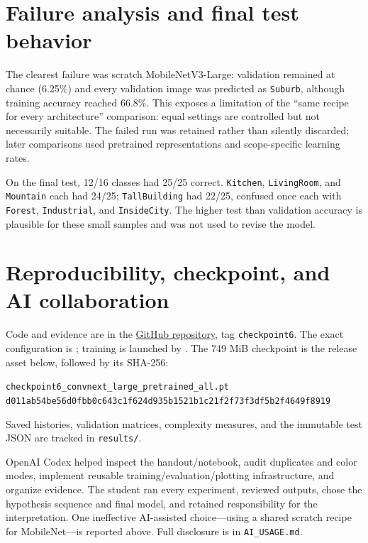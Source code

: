 \documentclass[10pt]{article}
\begin{document}
\section*{Failure analysis and final test behavior}
The clearest failure was scratch MobileNetV3-Large: validation remained at
chance (6.25\%) and every validation image was predicted as \texttt{Suburb},
although training accuracy reached 66.8\%. This exposes a limitation of the
``same recipe for every architecture'' comparison: equal settings are
controlled but not necessarily suitable. The failed run was retained rather
than silently discarded; later comparisons used pretrained representations
and scope-specific learning rates.

On the final test, 12/16 classes had 25/25 correct. \texttt{Kitchen},
\texttt{LivingRoom}, and \texttt{Mountain} each had 24/25; \texttt{TallBuilding}
had 22/25, confused once each with \texttt{Forest}, \texttt{Industrial}, and
\texttt{InsideCity}. The higher test than validation accuracy is plausible for
these small samples and was not used to revise the model.

\section*{Reproducibility, checkpoint, and AI collaboration}
Code and evidence are in the
\href{https://github.com/PritomKumarPaul/computer-vision-assignment1}{GitHub repository},
tag \texttt{checkpoint6}. The exact configuration is
; training is
launched by . The 749 MiB
checkpoint is the release asset below, followed by its SHA-256:
\begin{center}
{\scriptsize\texttt{checkpoint6\_convnext\_large\_pretrained\_all.pt}}\\[-1pt]
{\tiny\texttt{d011ab54be56d0fbb0c643c1f624d935b1521b1c21f2f73f3df5b2f4649f8919}}
\end{center}
Saved histories, validation matrices, complexity measures, and the immutable
test JSON are tracked in \texttt{results/}.

OpenAI Codex helped inspect the handout/notebook, audit duplicates and color
modes, implement reusable training/evaluation/plotting infrastructure, and
organize evidence. The student ran every experiment, reviewed outputs, chose
the hypothesis sequence and final model, and retained responsibility for the
interpretation. One ineffective AI-assisted choice---using a shared scratch
recipe for MobileNet---is reported above. Full disclosure is in
\texttt{AI\_USAGE.md}.
\end{document}
